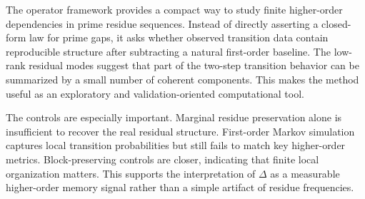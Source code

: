 The operator framework provides a compact way to study finite higher-order dependencies in prime residue sequences. Instead of directly asserting a closed-form law for prime gaps, it asks whether observed transition data contain reproducible structure after subtracting a natural first-order baseline. The low-rank residual modes suggest that part of the two-step transition behavior can be summarized by a small number of coherent components. This makes the method useful as an exploratory and validation-oriented computational tool.

The controls are especially important. Marginal residue preservation alone is insufficient to recover the real residual structure. First-order Markov simulation captures local transition probabilities but still fails to match key higher-order metrics. Block-preserving controls are closer, indicating that finite local organization matters. This supports the interpretation of \(\Delta\) as a measurable higher-order memory signal rather than a simple artifact of residue frequencies.
